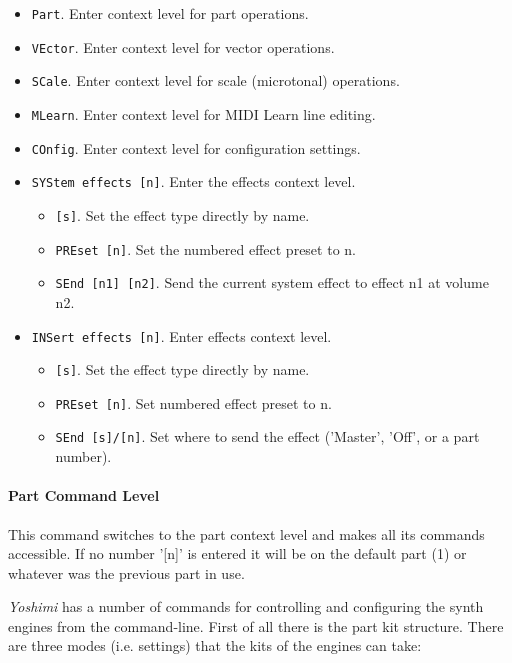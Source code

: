    \begin{itemize}
      \item \texttt{Part}. Enter context level for part operations.
      \item \texttt{VEctor}. Enter context level for vector operations.
      \item \texttt{SCale}. Enter context level for scale (microtonal) operations.
      \item \texttt{MLearn}. Enter context level for MIDI Learn line editing.
      \item \texttt{COnfig}. Enter context level for configuration settings.
      \item \texttt{SYStem effects [n]}. Enter the effects context level.
      \begin{itemize}
         \item \texttt{[s]}.  Set the effect type directly by name.
         \item \texttt{PREset [n]}. Set the numbered effect preset to n.
         \item \texttt{SEnd [n1] [n2]}. Send the current system effect to effect n1
            at volume n2.
      \end{itemize}
      \item \texttt{INSert effects [n]}. Enter effects context level.
      \begin{itemize}
         \item \texttt{[s]}. Set the effect type directly by name.
         \item \texttt{PREset [n]}. Set numbered effect preset to n.
         \item \texttt{SEnd [s]/[n]}. Set where to send the effect
            ('Master', 'Off', or a part number).
      \end{itemize}
   \end{itemize}

\paragraph{Part Command Level}
\label{paragraph:command_line_context_level_part}

   This command switches to the part context level and makes all its commands
   accessible.  If no number '[n]' is entered it will be on the default part
   (1) or whatever was the previous part in use.

   \textsl{Yoshimi} has a number of commands for controlling and configuring
   the synth engines from the command-line. First of all there is the part
   kit structure.
   There are three modes (i.e. settings) that the kits of the engines
   can take:


